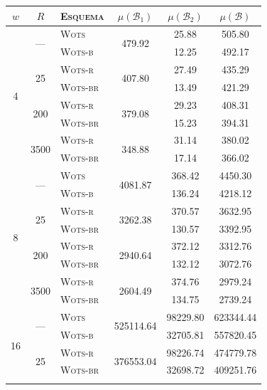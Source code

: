 \documentclass{ufsctex/ufsctex}
\newcommand{\wots}{\textsc{Wots}}
\newcommand{\wotsb}{\textsc{Wots-b}}
\newcommand{\wotsr}{\textsc{Wots-r}}
\newcommand{\wotsbr}{\textsc{Wots-br}}
\begin{document}
\begin{table}
  \setlength{\tabcolsep}{8pt}
  \footnotesize
  \centering
  \begin{tabular}{cclccc}
    \toprule
    $w$ & $R$
      & \textsc{Esquema} & $\mu(\mathcal{B}_1)$
      & $\mu(\mathcal{B}_2)$ & $\mu(\mathcal{B})$ \\
    \toprule
    \multirow{8}{*}{4} & \multirow{2}{*}{---}
      & \wots{} & \multirow{2}{*}{479.92} & 25.88 & 505.80 \\
    & & \wotsb{} & & 12.25 & 492.17 \\ \cline{2-6}
    & \multirow{2}{*}{25}
      & \wotsr{} & \multirow{2}{*}{407.80} & 27.49 & 435.29 \\
    & & \wotsbr{} & & 13.49 & 421.29 \\ \cline{2-6}
    & \multirow{2}{*}{200}
      & \wotsr{} & \multirow{2}{*}{379.08} & 29.23 & 408.31 \\
    & & \wotsbr{} & & 15.23 & 394.31 \\ \cline{2-6}
    & \multirow{2}{*}{3500}
      & \wotsr{} & \multirow{2}{*}{348.88} & 31.14 & 380.02 \\
    & & \wotsbr{} & & 17.14 & 366.02 \\
    \midrule
    \multirow{8}{*}{8} & \multirow{2}{*}{---}
      & \wots{} & \multirow{2}{*}{4081.87} & 368.42 & 4450.30 \\
    & & \wotsb{} & & 136.24 & 4218.12 \\ \cline{2-6}
    & \multirow{2}{*}{25}
      & \wotsr{} & \multirow{2}{*}{3262.38} & 370.57 & 3632.95 \\
    & & \wotsbr{} & & 130.57 & 3392.95 \\ \cline{2-6}
    & \multirow{2}{*}{200}
      & \wotsr{} & \multirow{2}{*}{2940.64} & 372.12 & 3312.76 \\
    & & \wotsbr{} & & 132.12 & 3072.76 \\ \cline{2-6}
    & \multirow{2}{*}{3500}
      & \wotsr{} & \multirow{2}{*}{2604.49} & 374.76 & 2979.24 \\
    & & \wotsbr{} & & 134.75 & 2739.24 \\
    \midrule
    \multirow{8}{*}{16} & \multirow{2}{*}{---}
      & \wots{} & \multirow{2}{*}{525114.64} & 98229.80 & 623344.44 \\
    & & \wotsb{} & & 32705.81 & 557820.45 \\ \cline{2-6}
    & \multirow{2}{*}{25}
      & \wotsr{} & \multirow{2}{*}{376553.04} & 98226.74 & 474779.78 \\
    & & \wotsbr{} & & 32698.72 & 409251.76 \\ \cline{2-6}

\end{tabular}
\end{table}
\end{document}
